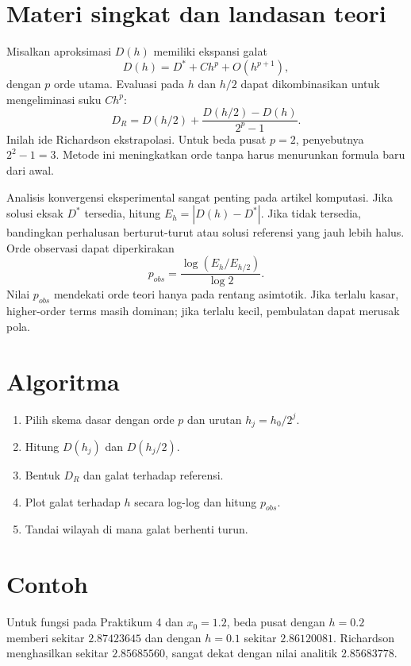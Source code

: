 \documentclass[book,english,noindex,lean,nobackpage,nocopyright,noupdate,nofiglist,notablist]{enacom}
\begin{document}
\section{Materi singkat dan landasan teori}
Misalkan aproksimasi $D(h)$ memiliki ekspansi galat
\begin{equation}
D(h)=D^*+C h^p+O(h^{p+1}),
\end{equation}
dengan $p$ orde utama. Evaluasi pada $h$ dan $h/2$ dapat dikombinasikan untuk mengeliminasi suku $Ch^p$:
\begin{equation}
D_R=D(h/2)+\frac{D(h/2)-D(h)}{2^p-1}.
\end{equation}
Inilah ide Richardson ekstrapolasi. Untuk beda pusat $p=2$, penyebutnya $2^2-1=3$. Metode ini meningkatkan orde tanpa harus menurunkan formula baru dari awal.

Analisis konvergensi eksperimental sangat penting pada artikel komputasi. Jika solusi eksak $D^*$ tersedia, hitung $E_h=|D(h)-D^*|$. Jika tidak tersedia, bandingkan perhalusan berturut-turut atau solusi referensi yang jauh lebih halus. Orde observasi dapat diperkirakan
\begin{equation}
p_{obs}=\frac{\log(E_h/E_{h/2})}{\log 2}.
\end{equation}
Nilai $p_{obs}$ mendekati orde teori hanya pada rentang asimtotik. Jika terlalu kasar, higher-order terms masih dominan; jika terlalu kecil, pembulatan dapat merusak pola.

\section{Algoritma}
\begin{enumerate}
\item Pilih skema dasar dengan orde $p$ dan urutan $h_j=h_0/2^j$.
\item Hitung $D(h_j)$ dan $D(h_j/2)$.
\item Bentuk $D_R$ dan galat terhadap referensi.
\item Plot galat terhadap $h$ secara log-log dan hitung $p_{obs}$.
\item Tandai wilayah di mana galat berhenti turun.
\end{enumerate}

\section{Contoh}
Untuk fungsi pada Praktikum 4 dan $x_0=1.2$, beda pusat dengan $h=0.2$ memberi sekitar $2.87423645$ dan dengan $h=0.1$ sekitar $2.86120081$. Richardson menghasilkan sekitar $2.85685560$, sangat dekat dengan nilai analitik $2.85683778$.
\end{document}
